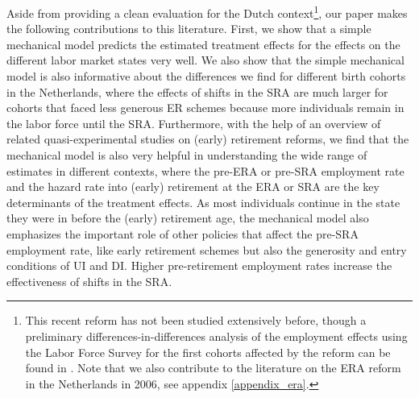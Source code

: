 \documentclass[12pt,a4paper]{article}
\begin{document}
Aside from providing a clean evaluation for the Dutch context\footnote{This recent reform has not been studied extensively before, though a preliminary differences-in-differences analysis of the employment effects using the Labor Force Survey for the first cohorts affected by the reform can be found in \cite{de_vos_social_2019}. Note that we also contribute to the literature on the ERA reform in the Netherlands in 2006, see appendix \ref{appendix_era}.}, our paper makes the following contributions to this literature.
First, we show that a simple mechanical model predicts the estimated treatment effects for the effects on the different labor market states very well. We also show that the simple mechanical model is also informative about the differences we find for different birth cohorts in the Netherlands, where the effects of shifts in the SRA are much larger for cohorts that faced less generous ER schemes because more individuals remain in the labor force until the SRA. Furthermore, with the help of an overview of related quasi-experimental studies on (early) retirement reforms, we find that the mechanical model is also very helpful in understanding the wide range of estimates in different contexts, where the pre-ERA or pre-SRA employment rate and the hazard rate into (early) retirement at the ERA or SRA are the key determinants of the treatment effects. As most individuals continue in the state they were in before the (early) retirement age, the mechanical model also emphasizes the important role of other policies that affect the pre-SRA employment rate, like early retirement schemes but also the generosity and entry conditions of UI and DI. Higher pre-retirement employment rates increase the effectiveness of shifts in the SRA.

\end{document}

